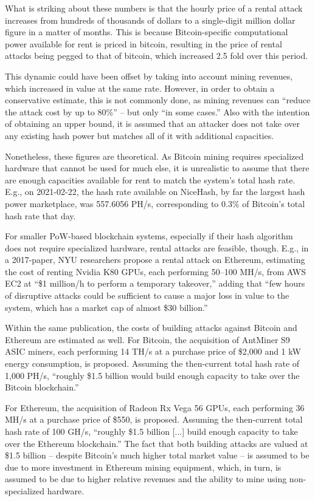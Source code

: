 What is striking about these numbers is that the hourly price of a rental attack increases from hundreds of thousands of dollars to a single-digit million dollar figure in a matter of months.
This is because Bitcoin-specific computational power available for rent is priced in bitcoin, resulting in the price of rental attacks being pegged to that of bitcoin, which increased 2.5 fold over this period.

This dynamic could have been offset by taking into account mining revenues, which increased in value at the same rate.
However, in order to obtain a conservative estimate, this is not commonly done, as mining revenues can ``reduce the attack cost by up to 80\%'' -- but only ``in some cases.'' \autocite{crypto512021about}
Also with the intention of obtaining an upper bound, it is assumed that an attacker does not take over any existing hash power but matches all of it with additional capacities.

Nonetheless, these figures are theoretical.
As Bitcoin mining requires specialized hardware that cannot be used for much else, it is unrealistic to assume that there are enough capacities available for rent to match the system's total hash rate.
E.g., on 2021-02-22, the hash rate available on NiceHash, by far the largest hash power marketplace, was 557.6056 PH/s, corresponding to 0.3\% of Bitcoin's total hash rate that day.

For smaller PoW-based blockchain systems, especially if their hash algorithm does not require specialized hardware, rental attacks are feasible, though.
E.g., in a 2017-paper, NYU researchers propose a rental attack on Ethereum, \autocite[95]{bonneau2013} estimating the cost of renting Nvidia K80 GPUs, each performing 50–100 MH/s, from AWS EC2 at ``\$1 million/h to perform a temporary takeover,'' adding that ``few hours of disruptive attacks could be sufficient to cause a major loss in value to the system, which has a market cap of almost \$30 billion.''

Within the same publication, the costs of building attacks against Bitcoin and Ethereum are estimated as well. \autocite[95, 96]{bonneau2013}
For Bitcoin, the acquisition of AntMiner S9 ASIC miners, each performing 14 TH/s at a purchase price of \$2,000 and 1 kW energy consumption, is proposed.
Assuming the then-current total hash rate of 1,000 PH/s, ``roughly \$1.5 billion would build enough capacity to take over the Bitcoin blockchain.''

For Ethereum, the acquisition of Radeon Rx Vega 56 GPUs, each performing 36 MH/s at a purchase price of \$550, is proposed.
Assuming the then-current total hash rate of 100 GH/s, ``roughly \$1.5 billion [...] build enough capacity to take over the Ethereum blockchain.''
The fact that both building attacks are valued at \$1.5 billion -- despite Bitcoin's much higher total market value -- is assumed to be due to more investment in Ethereum mining equipment, which, in turn, is assumed to be due to higher relative revenues and the ability to mine using non-specialized hardware. \autocite[96]{bonneau2013}

